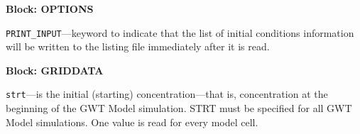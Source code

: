 
\item \textbf{Block: OPTIONS}

\begin{description}
\item \texttt{PRINT\_INPUT}---keyword to indicate that the list of initial conditions information will be written to the listing file immediately after it is read.

\end{description}
\item \textbf{Block: GRIDDATA}

\begin{description}
\item \texttt{strt}---is the initial (starting) concentration---that is, concentration at the beginning of the GWT Model simulation.  STRT must be specified for all GWT Model simulations. One value is read for every model cell.

\end{description}

